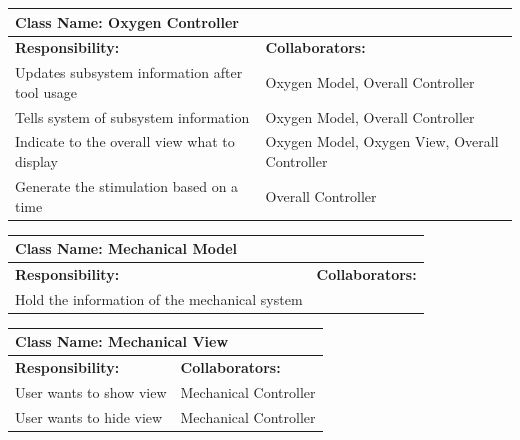 \documentclass[12pt, titlepage]{article}
\begin{document}
\begin{enumerate}[a)]
	\begin{table}[H]
		\centering
		\begin{tabular}{|p{10cm}|p{5cm}|}
		\hline 
		 \multicolumn{2}{|l|}{\textbf{Class Name: Oxygen Controller}} \\
		\hline
		\textbf{Responsibility:} & \textbf{Collaborators:} \\
		\hline
		Updates subsystem information after tool usage & Oxygen Model, Overall Controller\\
		\hline
		 Tells system of subsystem information & Oxygen Model, Overall Controller\\
		\hline
		 Indicate to the overall view what to display & Oxygen Model, Oxygen View, Overall Controller\\
		\hline
		 Generate the stimulation based on a time & Overall Controller \\
		\hline
		\end{tabular}
	\end{table}

	\begin{table}[H]
		\centering
		\begin{tabular}{|p{10cm}|p{5cm}|}
		\hline 
		 \multicolumn{2}{|l|}{\textbf{Class Name: Mechanical Model}} \\
		\hline
		\textbf{Responsibility:} & \textbf{Collaborators:} \\
		\hline
		 Hold the information of the mechanical system & \\
		\hline
		\end{tabular}
	\end{table}

	\begin{table}[H]
		\centering
		\begin{tabular}{|p{10cm}|p{5cm}|}
		\hline 
		 \multicolumn{2}{|l|}{\textbf{Class Name: Mechanical View}} \\
		\hline
		\textbf{Responsibility:} & \textbf{Collaborators:} \\
		\hline
		 User wants to show view & Mechanical Controller\\
		\hline
		User wants to hide view & Mechanical Controller\\
		\hline
		\end{tabular}
	\end{table}


\end{enumerate}
\end{document}
